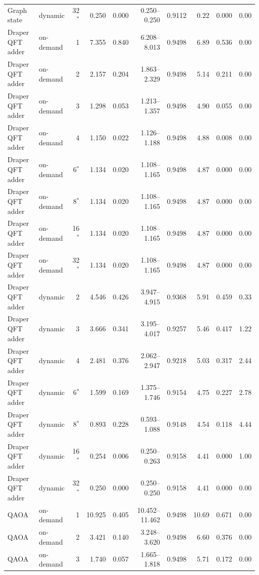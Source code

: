 {\begin{longtable}{@{}llrrrrrrrr@{}}
Graph state & dynamic & 32$^*$ & 0.250 & 0.000 & 0.250--0.250 & 0.9112 & 0.22 & 0.000 & 0.00 \\
Draper QFT adder & on-demand & 1 & 7.355 & 0.840 & 6.208--8.013 & 0.9498 & 6.89 & 0.536 & 0.00 \\
Draper QFT adder & on-demand & 2 & 2.157 & 0.204 & 1.863--2.329 & 0.9498 & 5.14 & 0.211 & 0.00 \\
Draper QFT adder & on-demand & 3 & 1.298 & 0.053 & 1.213--1.357 & 0.9498 & 4.90 & 0.055 & 0.00 \\
Draper QFT adder & on-demand & 4 & 1.150 & 0.022 & 1.126--1.188 & 0.9498 & 4.88 & 0.008 & 0.00 \\
Draper QFT adder & on-demand & 6$^*$ & 1.134 & 0.020 & 1.108--1.165 & 0.9498 & 4.87 & 0.000 & 0.00 \\
Draper QFT adder & on-demand & 8$^*$ & 1.134 & 0.020 & 1.108--1.165 & 0.9498 & 4.87 & 0.000 & 0.00 \\
Draper QFT adder & on-demand & 16$^*$ & 1.134 & 0.020 & 1.108--1.165 & 0.9498 & 4.87 & 0.000 & 0.00 \\
Draper QFT adder & on-demand & 32$^*$ & 1.134 & 0.020 & 1.108--1.165 & 0.9498 & 4.87 & 0.000 & 0.00 \\
Draper QFT adder & dynamic & 2 & 4.546 & 0.426 & 3.947--4.915 & 0.9368 & 5.91 & 0.459 & 0.33 \\
Draper QFT adder & dynamic & 3 & 3.666 & 0.341 & 3.195--4.017 & 0.9257 & 5.46 & 0.417 & 1.22 \\
Draper QFT adder & dynamic & 4 & 2.481 & 0.376 & 2.062--2.947 & 0.9218 & 5.03 & 0.317 & 2.44 \\
Draper QFT adder & dynamic & 6$^*$ & 1.599 & 0.169 & 1.375--1.746 & 0.9154 & 4.75 & 0.227 & 2.78 \\
Draper QFT adder & dynamic & 8$^*$ & 0.893 & 0.228 & 0.593--1.088 & 0.9148 & 4.54 & 0.118 & 4.44 \\
Draper QFT adder & dynamic & 16$^*$ & 0.254 & 0.006 & 0.250--0.263 & 0.9158 & 4.41 & 0.000 & 1.00 \\
Draper QFT adder & dynamic & 32$^*$ & 0.250 & 0.000 & 0.250--0.250 & 0.9158 & 4.41 & 0.000 & 0.00 \\
QAOA & on-demand & 1 & 10.925 & 0.405 & 10.452--11.462 & 0.9498 & 10.69 & 0.671 & 0.00 \\
QAOA & on-demand & 2 & 3.421 & 0.140 & 3.248--3.620 & 0.9498 & 6.60 & 0.376 & 0.00 \\
QAOA & on-demand & 3 & 1.740 & 0.057 & 1.665--1.818 & 0.9498 & 5.71 & 0.172 & 0.00 \\

\end{longtable}}

